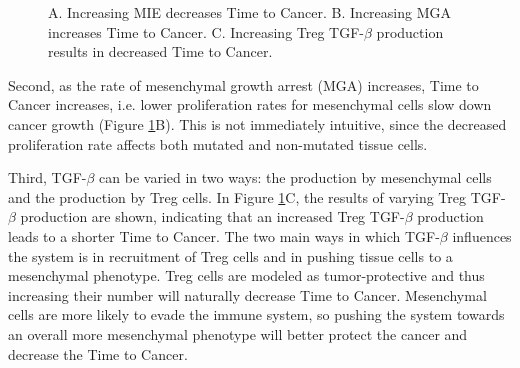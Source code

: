 \documentclass[11pt, a4paper, preprint]{article}
\begin{document}
\begin{figure}[H]
\center
{}
\caption{
A. Increasing MIE decreases Time to Cancer. 
B. Increasing MGA increases Time to Cancer.
C. Increasing Treg TGF-$\beta$ production results in decreased Time to Cancer.
}
\label{fig:FirstSurvivalCurves}
\end{figure}

Second, as the rate of mesenchymal growth arrest (MGA) increases, Time to Cancer increases, i.e. lower proliferation rates for mesenchymal cells slow down cancer growth (Figure \ref{fig:FirstSurvivalCurves}B).
This is not immediately intuitive, since the decreased proliferation rate affects both mutated and non-mutated tissue cells.

Third, TGF-$\beta$ can be varied in two ways: the production by mesenchymal cells and the production by Treg cells.
In Figure \ref{fig:FirstSurvivalCurves}C, the results of varying Treg TGF-$\beta$ production are shown, indicating that an increased Treg TGF-$\beta$ production leads to a shorter Time to Cancer.
The two main ways in which TGF-$\beta$ influences the system is in recruitment of Treg cells and in pushing tissue cells to a mesenchymal phenotype.
Treg cells are modeled as tumor-protective and thus increasing their number will naturally decrease Time to Cancer.
Mesenchymal cells are more likely to evade the immune system, so pushing the system towards an overall more mesenchymal phenotype will better protect the cancer and decrease the Time to Cancer.
\end{document}
